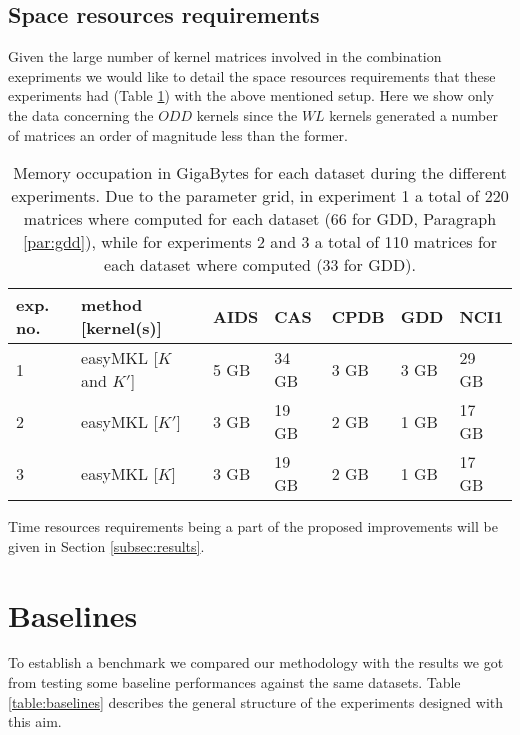 \subsection{Space resources requirements}
Given the large number of kernel matrices involved in the combination exepriments
we would like to detail the space resources requirements that these experiments
had (Table \ref{table:space}) with the above mentioned setup.
Here we show only the data concerning the $ODD$ kernels since the $WL$ kernels
generated a number of matrices an order of magnitude less than the former.

\begin{table}[ht]
    \centering
    \begin{tabular}{|l|l|l|l|l|l|l|}
        \hline
        exp. no. & method [kernel(s)] & AIDS & CAS & CPDB & GDD & NCI1 \\
        \hline
        1 & easyMKL [$K$ and $K'$] & 5 GB & 34 GB & 3 GB & 3 GB & 29 GB \\
        \hline
        2 & easyMKL [$K'$] & 3 GB & 19 GB & 2 GB & 1 GB & 17 GB \\
        \hline
        3 & easyMKL [$K$] & 3 GB & 19 GB & 2 GB & 1 GB & 17 GB \\
        \hline
    \end{tabular}
    \caption{Memory occupation in GigaBytes for each dataset during the different
    experiments. Due to the parameter grid, in experiment 1 a total of 220 matrices
    where computed for each dataset (66 for GDD, Paragraph \ref{par:gdd}), while
    for experiments 2 and 3 a total of 110 matrices for each dataset where computed
    (33 for GDD).}
    \label{table:space}
\end{table}

Time resources requirements being a part of the proposed improvements will be given
in Section \ref{subsec:results}.

\section{Baselines}
To establish a benchmark we compared our methodology with the results we got
from testing some baseline performances against the same datasets.
Table \ref{table:baselines} describes the general structure of the experiments
designed with this aim.


